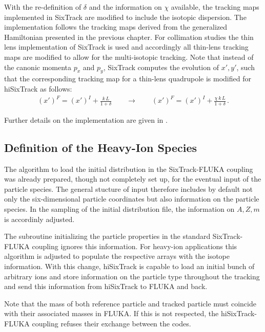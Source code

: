With the re-definition of $\delta$ and the information on $\chi$ available, the tracking maps implemented in SixTrack are modified to include the isotopic dispersion. The implementation follows the tracking maps derived from the generalized Hamiltonian presented in the previous chapter. For collimation studies the thin lens implementation of SixTrack is used and accordingly all thin-lens tracking maps are modified to allow for the multi-isotopic tracking. Note that instead of the canonic momenta $p_x$ and $p_y$, SixTrack computes the evolution of $x',y'$, such that the corresponding tracking map for a thin-lens quadrupole is modified for hiSixTrack as follows:
%
\begin{align}
  (x')^F = (x')^I + \frac{k \, L}{1+\delta} \quad \quad \rightarrow \quad \quad   (x')^F = (x')^I + \frac{\chi \, k \, L}{1+\delta} \, .
\end{align}

Further details on the implementation are given in .


\subsection{Definition of the Heavy-Ion Species}



The algorithm to load the initial distribution in the SixTrack-FLUKA coupling was already prepared, though not completely set up, for the eventual input of the particle species. The general stucture of input therefore includes by default not only the six-dimensional particle coordinates but also information on the particle species. In the sampling of the initial distribution file, the information on $A,Z,m$ is accordinly adjusted.

The subroutine initializing the particle properties in the standard SixTrack-FLUKA coupling ignores this information. For heavy-ion applications this algorithm is adjusted to populate the respective arrays with the isotope information. With this change, hiSixTrack is capable to load an initial bunch of arbitrary ions and store information on the particle type throughout the tracking and send this information from hiSixTrack to FLUKA and back. 

Note that the mass of both reference particle and tracked particle must coincide with their associated masses in FLUKA. If this is not respected, the hiSixTrack-FLUKA coupling refuses their exchange between the codes.







